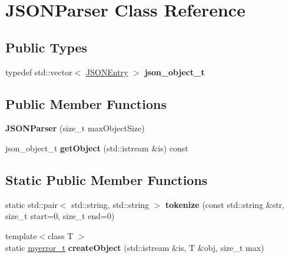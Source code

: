 \hypertarget{classJSONParser}{}\section{J\+S\+O\+N\+Parser Class Reference}
\label{classJSONParser}
\subsection*{Public Types}
\begin{DoxyCompactItemize}
\item 
\hypertarget{classJSONParser_ae079e45d2ae7a6b40f3e237c453f2fb9}{}typedef std\+::vector$<$ \hyperlink{classJSONEntry}{J\+S\+O\+N\+Entry} $>$ {\bfseries json\+\_\+object\+\_\+t}\label{classJSONParser_ae079e45d2ae7a6b40f3e237c453f2fb9}

\end{DoxyCompactItemize}
\subsection*{Public Member Functions}
\begin{DoxyCompactItemize}
\item 
\hypertarget{classJSONParser_a02ee5f12243632fb009ba1778b31202b}{}{\bfseries J\+S\+O\+N\+Parser} (size\+\_\+t max\+Object\+Size)\label{classJSONParser_a02ee5f12243632fb009ba1778b31202b}

\item 
\hypertarget{classJSONParser_a22ae47ecdabb9da4e21f213624b7c8c9}{}json\+\_\+object\+\_\+t {\bfseries get\+Object} (std\+::istream \&is) const \label{classJSONParser_a22ae47ecdabb9da4e21f213624b7c8c9}

\end{DoxyCompactItemize}
\subsection*{Static Public Member Functions}
\begin{DoxyCompactItemize}
\item 
\hypertarget{classJSONParser_a7c2e1d4bbd36add70132523fa8767d52}{}static std\+::pair$<$ std\+::string, std\+::string $>$ {\bfseries tokenize} (const std\+::string \&str, size\+\_\+t start=0, size\+\_\+t end=0)\label{classJSONParser_a7c2e1d4bbd36add70132523fa8767d52}

\item 
\hypertarget{classJSONParser_a67954f3aafc072fc722798e6cac261ec}{}{\footnotesize template$<$class T $>$ }\\static \hyperlink{error_8hpp_acabd2917084445509becf54ab64a4bd0}{myerror\+\_\+t} {\bfseries create\+Object} (std\+::istream \&is, T \&obj, size\+\_\+t max)\label{classJSONParser_a67954f3aafc072fc722798e6cac261ec}

\end{DoxyCompactItemize}
